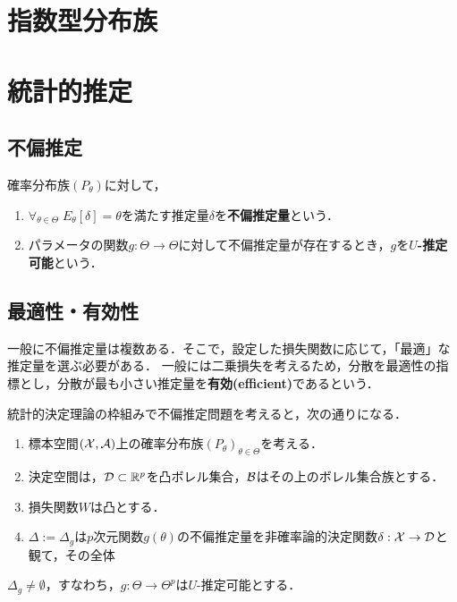 \documentclass[uplatex,dvipdfmx]{jsreport}
\begin{document}
\section{指数型分布族}

\section{統計的推定}

\subsection{不偏推定}

\begin{definition}
    確率分布族$(P_\theta)$に対して，
    \begin{enumerate}
        \item $\forall_{\theta\in\Theta}\;E_\theta[\delta]=\theta$を満たす推定量$\delta$を\textbf{不偏推定量}という．
        \item パラメータの関数$g:\Theta\to\Theta$に対して不偏推定量が存在するとき，$g$を\textbf{$U$-推定可能}という．
    \end{enumerate}
\end{definition}

\subsection{最適性・有効性}

\begin{tcolorbox}[colframe=ForestGreen, colback=ForestGreen!10!white,breakable,colbacktitle=ForestGreen!40!white,coltitle=black,fonttitle=\bfseries\sffamily,
title=]
    一般に不偏推定量は複数ある．そこで，設定した損失関数に応じて，「最適」な推定量を選ぶ必要がある．
    一般には二乗損失を考えるため，分散を最適性の指標とし，分散が最も小さい推定量を\textbf{有効(efficient)}であるという．
\end{tcolorbox}

\begin{notation}
    統計的決定理論の枠組みで不偏推定問題を考えると，次の通りになる．
    \begin{enumerate}
        \item 標本空間$(\mathcal{X},\mathcal{A})$上の確率分布族$(P_\theta)_{\theta\in\Theta}$を考える．
        \item 決定空間は，$\mathcal{D}\subset\mathbb{R}^p$を凸ボレル集合，$\mathcal{B}$はその上のボレル集合族とする．
        \item 損失関数$W$は凸とする．
        \item $\Delta:=\Delta_g$は$p$次元関数$g(\theta)$の不偏推定量を非確率論的決定関数$\delta:\mathcal{X}\to\mathcal{D}$と観て，その全体
    \end{enumerate}
    $\Delta_g\ne\emptyset$，すなわち，$g:\Theta\to\Theta^p$は$U$-推定可能とする．
\end{notation}
\end{document}
